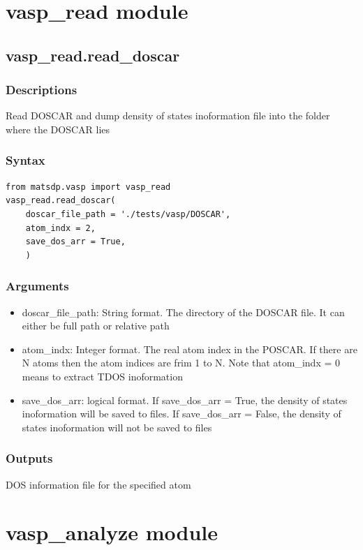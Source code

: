 \documentclass[12pt]{book}
\begin{document}
\section{vasp\_read module}

\subsection{vasp\_read.read\_doscar}

\subsubsection{Descriptions}
Read DOSCAR and dump density of states inoformation file into the folder where the DOSCAR lies
\subsubsection{Syntax}
\begin{lstlisting}
from matsdp.vasp import vasp_read
vasp_read.read_doscar(
    doscar_file_path = './tests/vasp/DOSCAR',
    atom_indx = 2,
    save_dos_arr = True,
    )
\end{lstlisting}
\subsubsection{Arguments}
\begin{itemize}
\item doscar\_file\_path: String format. The directory of the DOSCAR file. It can either be full path or relative path
\item atom\_indx: Integer format. The real atom index in the POSCAR. If there are N atoms then the atom indices are frim 1 to N. Note that atom\_indx = 0 means to extract TDOS inoformation
\item save\_dos\_arr: logical format. If save\_dos\_arr = True, the density of states inoformation will be saved to files. If save\_dos\_arr = False, the density of states inoformation will not be saved to files
\end{itemize}
\subsubsection{Outputs}
DOS information file for the specified atom

\section{vasp\_analyze module}
\end{document}
